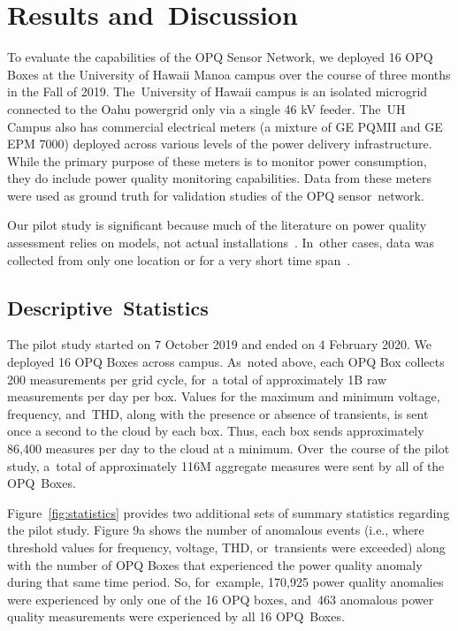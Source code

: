 \documentclass[energies,article,accept,moreauthors,pdftex]{Definitions/mdpi}
\begin{document}
\section{Results and~Discussion}
\label{sec:pilot-study}

To evaluate the capabilities of the OPQ Sensor Network, we deployed 16 OPQ Boxes at the University of Hawaii Manoa campus over the course of three months in the Fall of 2019. The~University of Hawaii campus is an isolated microgrid connected to the Oahu powergrid only via a single 46 kV feeder. The~UH Campus also has commercial electrical meters (a mixture of GE PQMII and GE EPM 7000) deployed across various levels of the power delivery infrastructure. While the primary purpose of these meters is to monitor power consumption, they do include power quality monitoring capabilities. Data from these meters were used as ground truth for validation studies of the OPQ sensor~network.

Our pilot study is significant because much of the literature on power quality assessment relies on models, not actual installations~\cite{anurangi_effects_2017,bayindir_effects_2016,farhoodnea_power_2012,shafiullah_experimental_2014}. In~other cases, data was collected from only one location or for a very short time span~\cite{kucuk_assessment_2013,viciana_openzmeter_2018}.

\subsection{Descriptive~Statistics}

The pilot study started on 7 October 2019 and ended on 4 February 2020. We deployed 16 OPQ Boxes across campus. As~noted above, each OPQ Box collects 200 measurements per grid cycle, for~a total of approximately 1B raw measurements per day per box. Values for the maximum and minimum voltage, frequency, and~THD, along with the presence or absence of transients, is sent once a second to the cloud by each box. Thus, each box sends approximately 86,400 measures per day to the cloud at a minimum. Over~the course of the pilot study, a~total of approximately 116M aggregate measures were sent by all of the OPQ~Boxes.

Figure~\ref{fig:statistics} provides two additional sets of summary statistics regarding the pilot study. Figure 9a shows the number of anomalous events (i.e., where threshold values for frequency, voltage, THD, or~transients were exceeded) along with the number of OPQ Boxes that experienced the power quality anomaly during that same time period. So, for~example, 170,925 power quality anomalies were experienced by only one of the 16 OPQ boxes, and~463 anomalous power quality measurements were experienced by all 16 OPQ~Boxes.
\end{document}
